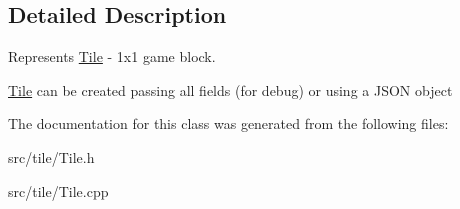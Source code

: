 \subsection{Detailed Description}
Represents \hyperlink{classTile}{Tile} -\/ 1x1 game block. 

\hyperlink{classTile}{Tile} can be created passing all fields (for debug) or using a J\-S\-O\-N object 

The documentation for this class was generated from the following files\-:\begin{DoxyCompactItemize}
\item 
src/tile/Tile.\-h\item 
src/tile/Tile.\-cpp\end{DoxyCompactItemize}
